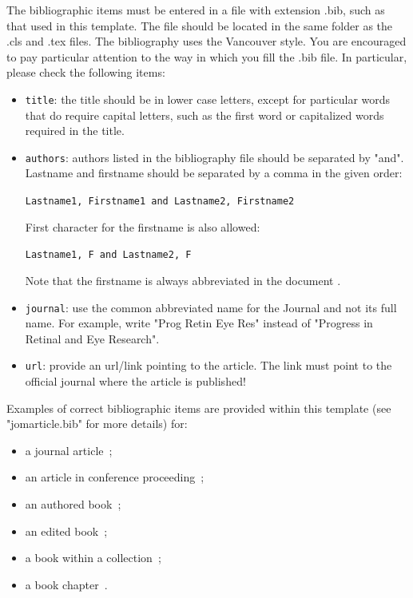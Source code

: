 \documentclass{jmoarticle}
\begin{document}
The bibliographic items must be entered in a file with extension .bib, such as
that used in this template. The file should be located in the same folder as
the .cls and .tex files.  The bibliography uses the Vancouver style. You are
encouraged to pay particular attention to the way in which you fill the .bib
file.  In particular, please check the following items:
%
\begin{itemize}
    \item \lstinline{title}: the title should be in lower case letters, except for
        particular words that do require capital letters, such as the first
        word or capitalized words required in the title.

    \item \lstinline{authors}: authors listed in the bibliography file
        should be separated by "and". Lastname and firstname should be separated
        by a comma in the given order:
    \begin{center}
        \lstinline{Lastname1, Firstname1 and Lastname2, Firstname2}
    \end{center}
    First character for the firstname is also allowed:
    \begin{center}
       \lstinline{Lastname1, F and Lastname2, F}
    \end{center}
    Note that the firstname is always abbreviated in the document \cite{example_article}.

    \item \lstinline{journal}: use the common abbreviated name for the Journal and
        not its full name. For example, write "Prog Retin Eye Res" instead of
        "Progress in Retinal and Eye Research".

    \item \lstinline{url}: provide an url/link pointing to the article. The link
        must point to the official journal where the article is published!
\end{itemize}
%
Examples of correct bibliographic items are provided within this template (see
"jomarticle.bib" for more details) for:
\begin{itemize}
\item a journal article~\cite{example_article};
\item an article in conference proceeding~\cite{example_inproceedings};
\item an authored book~\cite{example_authored_book};
\item an edited book~\cite{example_edited_book};
\item a book within a collection~\cite{example_book_collection};
\item a book chapter~\cite{example_book_chapter}.
\end{itemize}
\end{document}
